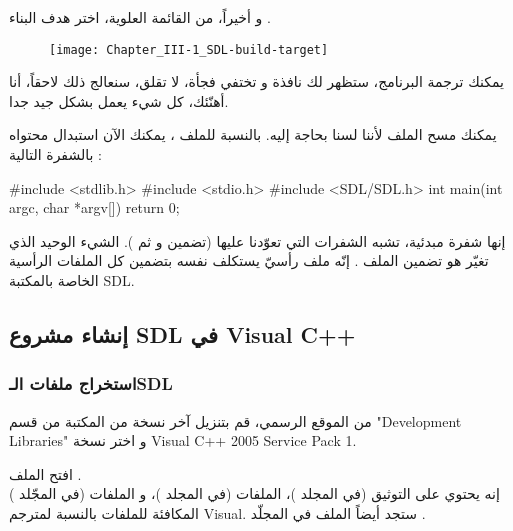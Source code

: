 \begin{tcolorbox}[breakable,title=ملاحظات مترجمة الكتاب, colback=orange!20, colframe=orange!70, fontupper=\footnotesize, coltitle=white, fonttitle=\normalsize, attach title]
و أخيراً، من القائمة العلوية، اختر هدف البناء 
.

\begin{figure}[H]
	\centering
	\texttt{[image: Chapter\_III-1\_SDL-build-target]}
\end{figure}


يمكنك ترجمة البرنامج، ستظهر لك نافذة و تختفي فجأة، لا تقلق، سنعالج ذلك لاحقاً، أنا أهنّئك، كل شيء يعمل بشكل جيد جدا.

\end{tcolorbox}

يمكنك مسح الملف 
لأننا لسنا بحاجة إليه. بالنسبة للملف 
، 
يمكنك الآن استبدال محتواه بالشفرة التالية :

\begin{Csource}
#include <stdlib.h>
#include <stdio.h>
#include <SDL/SDL.h>
int main(int argc, char *argv[])
{
	return 0;
}
\end{Csource}
إنها شفرة مبدئية، تشبه الشفرات التي تعوّدنا عليها (تضمين
و
ثم 
).
الشيء الوحيد الذي تغيّر هو تضمين الملف
.
إنّه ملف رأسيّ يستكلف نفسه بتضمين كل الملفات الرأسية الخاصة بالمكتبة 
\textenglish{SDL}.

\subsection{إنشاء مشروع \textenglish{SDL} في \textenglish{Visual C++}}

\subsubsection{استخراج ملفات الـ\textenglish{SDL}}

من الموقع الرسمي، قم بتنزيل آخر نسخة من المكتبة من قسم
"\textenglish{Development Libraries}"
و اختر نسخة
\textenglish{Visual C++ 2005 Service Pack 1}.

افتح الملف
.\\
إنه يحتوي  على التوثيق (في المجلد
)،
 الملفات
(في المجلد
)، 
و الملفات
(في المجّلد
)
المكافئة للملفات
بالنسبة لمترجم
\textenglish{Visual}.
ستجد أيضاً الملف 
في المجلّد
.

